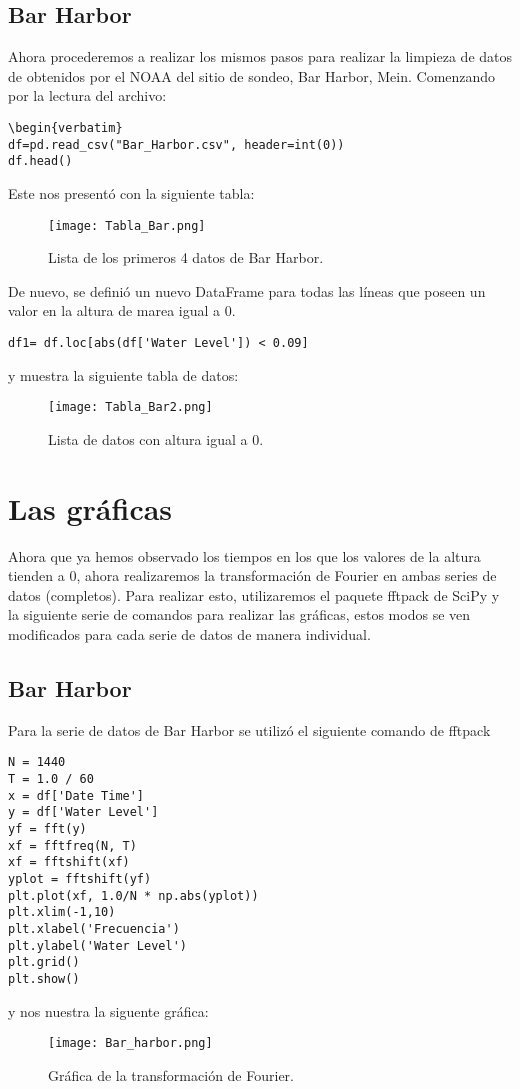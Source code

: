 \documentclass{article}
\begin{document}
\subsection{Bar Harbor}
Ahora procederemos a realizar los mismos pasos para realizar la limpieza de datos de obtenidos por el NOAA del sitio de sondeo, Bar Harbor, Mein. Comenzando por la lectura del archivo:
\begin{verbatim}
\begin{verbatim}
df=pd.read_csv("Bar_Harbor.csv", header=int(0))
df.head()
\end{verbatim}
Este nos presentó con la siguiente tabla:
\begin{figure}[ht!]
\centering
\texttt{[image: Tabla\_Bar.png]}
\caption{Lista de los primeros 4 datos de Bar Harbor.}
\end{figure}
De nuevo, se definió un nuevo DataFrame para todas las líneas que poseen un valor en la altura de marea igual a 0.
\begin{verbatim}
df1= df.loc[abs(df['Water Level']) < 0.09]
\end{verbatim}
\newpage
y muestra la siguiente tabla de datos:
\begin{figure}[ht!]
\centering
\texttt{[image: Tabla\_Bar2.png]}
\caption{Lista de datos con altura igual a 0.}
\end{figure}

\section{Las gráficas}
Ahora que ya hemos observado los tiempos en los que los valores de la altura tienden a 0, ahora realizaremos la transformación de Fourier en ambas series de datos (completos). Para realizar esto, utilizaremos el paquete fftpack de SciPy y la siguiente serie de comandos para realizar las gráficas, estos modos se ven modificados para cada serie de datos de manera individual.\\

\subsection{Bar Harbor}
Para la serie de datos de Bar Harbor se utilizó el siguiente comando de fftpack
\begin{verbatim}
N = 1440
T = 1.0 / 60
x = df['Date Time']
y = df['Water Level']
yf = fft(y)
xf = fftfreq(N, T)
xf = fftshift(xf)
yplot = fftshift(yf)
plt.plot(xf, 1.0/N * np.abs(yplot))
plt.xlim(-1,10)
plt.xlabel('Frecuencia')
plt.ylabel('Water Level')
plt.grid()
plt.show()
\end{verbatim}
y nos nuestra la siguente gráfica:
\begin{figure}[h]
\centering
\texttt{[image: Bar\_harbor.png]}
\caption{Gráfica de la transformación de Fourier.}
\end{figure}
\end{document}
